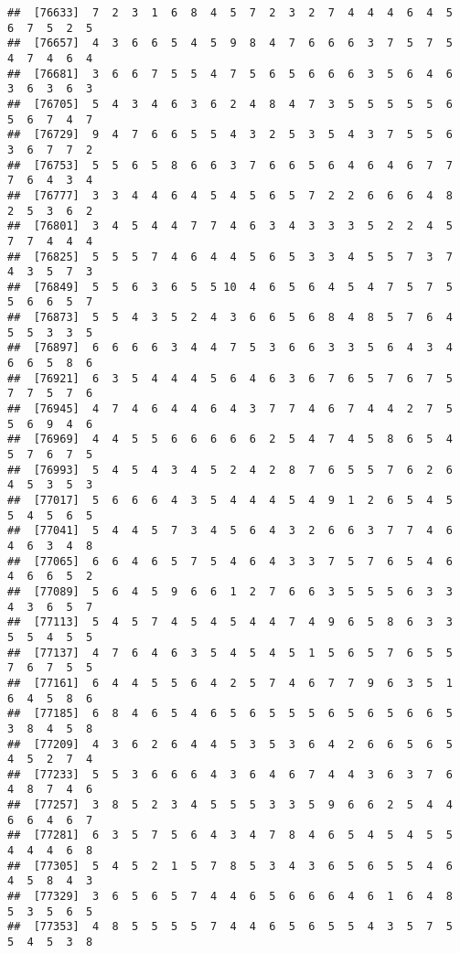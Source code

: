 \documentclass[
]{book}
\begin{document}
\begin{verbatim}
##  [76633]  7  2  3  1  6  8  4  5  7  2  3  2  7  4  4  4  6  4  5  6  7  5  2  5
##  [76657]  4  3  6  6  5  4  5  9  8  4  7  6  6  6  3  7  5  7  5  4  7  4  6  4
##  [76681]  3  6  6  7  5  5  4  7  5  6  5  6  6  6  3  5  6  4  6  3  6  3  6  3
##  [76705]  5  4  3  4  6  3  6  2  4  8  4  7  3  5  5  5  5  5  6  5  6  7  4  7
##  [76729]  9  4  7  6  6  5  5  4  3  2  5  3  5  4  3  7  5  5  6  3  6  7  7  2
##  [76753]  5  5  6  5  8  6  6  3  7  6  6  5  6  4  6  4  6  7  7  7  6  4  3  4
##  [76777]  3  3  4  4  6  4  5  4  5  6  5  7  2  2  6  6  6  4  8  2  5  3  6  2
##  [76801]  3  4  5  4  4  7  7  4  6  3  4  3  3  3  5  2  2  4  5  7  7  4  4  4
##  [76825]  5  5  5  7  4  6  4  4  5  6  5  3  3  4  5  5  7  3  7  4  3  5  7  3
##  [76849]  5  5  6  3  6  5  5 10  4  6  5  6  4  5  4  7  5  7  5  5  6  6  5  7
##  [76873]  5  5  4  3  5  2  4  3  6  6  5  6  8  4  8  5  7  6  4  5  5  3  3  5
##  [76897]  6  6  6  6  3  4  4  7  5  3  6  6  3  3  5  6  4  3  4  6  6  5  8  6
##  [76921]  6  3  5  4  4  4  5  6  4  6  3  6  7  6  5  7  6  7  5  7  7  5  7  6
##  [76945]  4  7  4  6  4  4  6  4  3  7  7  4  6  7  4  4  2  7  5  5  6  9  4  6
##  [76969]  4  4  5  5  6  6  6  6  6  2  5  4  7  4  5  8  6  5  4  5  7  6  7  5
##  [76993]  5  4  5  4  3  4  5  2  4  2  8  7  6  5  5  7  6  2  6  4  5  3  5  3
##  [77017]  5  6  6  6  4  3  5  4  4  4  5  4  9  1  2  6  5  4  5  5  4  5  6  5
##  [77041]  5  4  4  5  7  3  4  5  6  4  3  2  6  6  3  7  7  4  6  4  6  3  4  8
##  [77065]  6  6  4  6  5  7  5  4  6  4  3  3  7  5  7  6  5  4  6  4  6  6  5  2
##  [77089]  5  6  4  5  9  6  6  1  2  7  6  6  3  5  5  5  6  3  3  4  3  6  5  7
##  [77113]  5  4  5  7  4  5  4  5  4  4  7  4  9  6  5  8  6  3  3  5  5  4  5  5
##  [77137]  4  7  6  4  6  3  5  4  5  4  5  1  5  6  5  7  6  5  5  7  6  7  5  5
##  [77161]  6  4  4  5  5  6  4  2  5  7  4  6  7  7  9  6  3  5  1  6  4  5  8  6
##  [77185]  6  8  4  6  5  4  6  5  6  5  5  5  6  5  6  5  6  6  5  3  8  4  5  8
##  [77209]  4  3  6  2  6  4  4  5  3  5  3  6  4  2  6  6  5  6  5  4  5  2  7  4
##  [77233]  5  5  3  6  6  6  4  3  6  4  6  7  4  4  3  6  3  7  6  4  8  7  4  6
##  [77257]  3  8  5  2  3  4  5  5  5  3  3  5  9  6  6  2  5  4  4  6  6  4  6  7
##  [77281]  6  3  5  7  5  6  4  3  4  7  8  4  6  5  4  5  4  5  5  4  4  4  6  8
##  [77305]  5  4  5  2  1  5  7  8  5  3  4  3  6  5  6  5  5  4  6  4  5  8  4  3
##  [77329]  3  6  5  6  5  7  4  4  6  5  6  6  6  4  6  1  6  4  8  5  3  5  6  5
##  [77353]  4  8  5  5  5  5  7  4  4  6  5  6  5  5  4  3  5  7  5  5  4  5  3  8

\end{verbatim}
\end{document}
